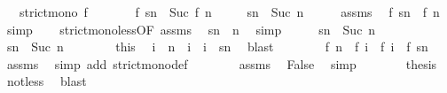 \begin{isabellebody}
\ \ \ {\isacartoucheopen}strict{\isacharunderscore}mono\ f{\isacartoucheclose}\isanewline
\ \ \ \ \ \ \ {\isacartoucheopen}f\ sn\ {\isacharequal}\ Suc\ {\isacharparenleft}f\ n{\isacharparenright}{\isacartoucheclose}\isanewline
\ \ \ \ \ {\isacartoucheopen}sn\ {\isacharequal}\ Suc\ n{\isacartoucheclose}\isanewline
%
\isadelimproof
%
\endisadelimproof
%
\isatagproof
{}\isamarkupfalse%
\ {\isacharminus}\isanewline
\ \ \isamarkupfalse%
\ assms{\isacharparenleft}{}{\isacharparenright}\ \isamarkupfalse%
\ {\isacartoucheopen}f\ sn\ {\isachargreater}\ f\ n{\isacartoucheclose}\ \isamarkupfalse%
\ simp\isanewline
\ \ \isamarkupfalse%
\ strict{\isacharunderscore}mono{\isacharunderscore}less{\isacharbrackleft}OF\ assms{\isacharparenleft}{}{\isacharparenright}{\isacharbrackright}\ \isamarkupfalse%
\ {\isacartoucheopen}sn\ {\isachargreater}\ n{\isacartoucheclose}\ \isamarkupfalse%
\ simp\isanewline
\ \ \isamarkupfalse%
\ \isamarkupfalse%
\ {\isacartoucheopen}sn\ {\isasymle}\ Suc\ n{\isacartoucheclose}\isanewline
\ \ \isamarkupfalse%
\ {\isacharminus}\isanewline
\ \ \ \ \isacommand{{\isacharbraceleft}}\isamarkupfalse%
\ \isamarkupfalse%
\ {\isacartoucheopen}sn\ {\isachargreater}\ Suc\ n{\isacartoucheclose}\isanewline
\ \ \ \ \ \ \isamarkupfalse%
\ this\ \isamarkupfalse%
\ i\ \ {\isacartoucheopen}n\ {\isacharless}\ i\ {\isasymand}\ i\ {\isacharless}\ sn{\isacartoucheclose}\ \isamarkupfalse%
\ blast\isanewline
\ \ \ \ \ \ \isamarkupfalse%
\ {\isacartoucheopen}f\ n\ {\isacharless}\ f\ i\ {\isasymand}\ f\ i\ {\isacharless}\ f\ sn{\isacartoucheclose}\ \isamarkupfalse%
\ assms{\isacharparenleft}{}{\isacharparenright}\ \isamarkupfalse%
\ {\isacharparenleft}simp\ add{\isacharcolon}\ strict{\isacharunderscore}mono{\isacharunderscore}def{\isacharparenright}\isanewline
\ \ \ \ \ \ \isamarkupfalse%
\ assms{\isacharparenleft}{}{\isacharparenright}\ \isamarkupfalse%
\ False\ \isamarkupfalse%
\ simp\isanewline
\ \ \ \ \isacommand{{\isacharbraceright}}\isamarkupfalse%
\ \isamarkupfalse%
\ {\isacharquery}thesis\ \isamarkupfalse%
\ not{\isacharunderscore}less\ \isamarkupfalse%
\ blast\isanewline

\end{isabellebody}
